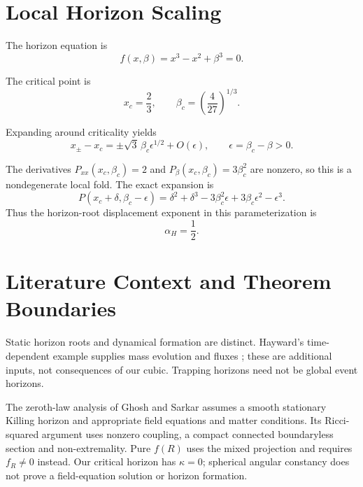 \documentclass[11pt,final]{article}
\begin{document}
\section{Local Horizon Scaling}

The horizon equation is
\begin{equation}
f(x,\beta)=x^3-x^2+\beta^3=0.
\end{equation}

The critical point is
\begin{equation}
x_c=\frac{2}{3}, \qquad \beta_c=\left(\frac{4}{27}\right)^{1/3}.
\end{equation}

Expanding around criticality yields
\begin{equation}
x_\pm-x_c=\pm\sqrt{3}\,\beta_c\epsilon^{1/2}+O(\epsilon),
\qquad \epsilon=\beta_c-\beta>0.
\end{equation}

The derivatives $P_{xx}(x_c,\beta_c)=2$ and
$P_\beta(x_c,\beta_c)=3\beta_c^2$ are nonzero, so this is a nondegenerate
local fold. The exact expansion is
\begin{equation}
P(x_c+\delta,\beta_c-\epsilon)=\delta^2+\delta^3
-3\beta_c^2\epsilon+3\beta_c\epsilon^2-\epsilon^3.
\end{equation}
Thus the horizon-root displacement exponent in this parameterization is
\begin{equation}
\alpha_H=\frac{1}{2}.
\end{equation}

\section{Literature Context and Theorem Boundaries}

Static horizon roots and dynamical formation are distinct. Hayward's
time-dependent example supplies mass evolution and fluxes
\cite{hayward2006}; these are additional inputs, not consequences of our cubic.
Trapping horizons need not be global event horizons.

The zeroth-law analysis of Ghosh and Sarkar \cite{ghosh2026zerothlaw}
assumes a smooth stationary Killing horizon and appropriate field equations
and matter conditions. Its Ricci-squared argument uses nonzero coupling,
a compact connected boundaryless section and non-extremality. Pure $f(R)$
uses the mixed projection and requires $f_R\ne0$ instead.
Our critical horizon has $\kappa=0$; spherical angular constancy does not
prove a field-equation solution or horizon formation.
\end{document}
